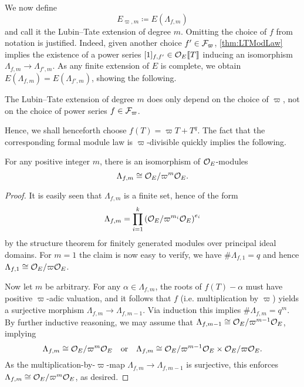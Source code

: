 \documentclass[../main.tex]{subfiles}
\begin{document}
We now define 
\begin{equation*}
  E_{\varpi, m} \coloneq E(\Lambda_{f, m})
\end{equation*}
and call it the Lubin--Tate extension of degree $m$. 
Omitting the choice of $f$ from notation is justified. Indeed, given 
another choice $f' \in \mathcal{F}_\varpi$, \cref{thm:LTModLaw} implies the 
existence of a power series $[1]_{f,f'} \in \mathcal{O}_E\llbracket T \rrbracket$ inducing an
isomorphism $\Lambda_{f,m} \to \Lambda_{f',m}$. As any finite extension of $E$
is complete, we obtain $E(\Lambda_{f,m}) = E(\Lambda_{f',m})$, showing the following.
\begin{lem}\label{lem:FiniteLTExtensionIndepOfF}
  The Lubin--Tate extension of degree $m$ does only depend on the choice of $\varpi$,
  not on the choice of power series $f \in \mathcal{F}_\varpi$. 
\end{lem}

Hence, we shall henceforth choose $f(T) = \varpi T + T^q$. 
The fact that the corresponding formal module law is $\varpi$-divisible quickly 
implies the following.
\begin{lem}\label{lem:StructureOfLambdamf}
  For any positive integer $m$, there is an isomorphism of $\mathcal{O}_E$-modules
  \begin{equation*}
    \Lambda_{f,m} \cong \mathcal{O}_E/\varpi^m\mathcal{O}_E.
  \end{equation*}
\begin{proof}
  It is easily seen that $\Lambda_{f,m}$ is a finite set, hence of the form
  \begin{equation*}
    \Lambda_{f,m} = \prod_{i = 1}^k \left(\mathcal{O}_E/\varpi^{m_i} \mathcal{O}_E \right)^{e_i}
  \end{equation*}
  by the structure theorem for finitely generated modules over principal ideal domains.
  For $m=1$ the claim is now easy to verify, we have $\# \Lambda_{f,1} = q$ and 
  hence $\Lambda_{f,1} \cong \mathcal{O}_E/\varpi\mathcal{O}_E$.

  Now let $m$ be arbitrary. For any $\alpha \in \Lambda_{f,m}$, the roots of
  $f(T) - \alpha$ must have positive $\varpi$-adic valuation, and it follows
  that $f$ (i.e. multiplication by $\varpi$) yields a
  surjective morphism $\Lambda_{f,m} \to \Lambda_{f,m-1}$. Via induction this
  implies $\# \Lambda_{f,m} = q^m$.
  By further inductive reasoning, we may assume that 
  $\Lambda_{f,m-1} \cong \mathcal{O}_E/\varpi^{m-1}\mathcal{O}_E$,  implying
  \begin{equation*}
    \Lambda_{f,m} \cong \mathcal{O}_E/\varpi^{m}\mathcal{O}_E \quad \text{or} \quad 
    \Lambda_{f,m} \cong \mathcal{O}_E/\varpi^{m-1}\mathcal{O}_E \times \mathcal{O}_E/\varpi \mathcal{O}_E.
  \end{equation*}
  As the multiplication-by-$\varpi$-map $\Lambda_{f,m} \to \Lambda_{f,m-1}$ is
  surjective, this enforces $\Lambda_{f,m} \cong \mathcal{O}_E/\varpi^m\mathcal{O}_E$, as desired.
\end{proof}
\end{lem}
\end{document}
